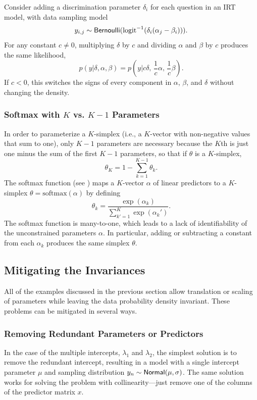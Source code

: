 Consider adding a discrimination parameter $\delta_i$ for each
question in an IRT model, with data sampling model
\[
y_{i, j} \sim \distro{Bernoulli}(\mbox{logit}^{-1}(\delta_i(\alpha_j - \beta_i))).
\]
For any constant $c \neq 0$, multiplying $\delta$ by $c$ and dividing
$\alpha$ and $\beta$ by $c$ produces the same likelihood,
\[
p(y|\delta,\alpha,\beta)
= p(y|c \delta, \, \frac{1}{c}\alpha, \, \frac{1}{c}\beta).
\]
If $c < 0$, this switches the signs of every component in $\alpha$,
$\beta$, and $\delta$ without changing the density.


\subsubsection{Softmax with $K$ vs. $K-1$ Parameters}

In order to parameterize a $K$-simplex (i.e., a $K$-vector with
non-negative values that sum to one), only $K - 1$ parameters are
necessary because the $K$th is just one minus the sum of the first $K
- 1$ parameters, so that if $\theta$ is a $K$-simplex,
%
\[
\theta_K = 1 - \sum_{k=1}^{K-1} \theta_k.
\]
%
The softmax function (see ) maps a $K$-vector
$\alpha$ of linear predictors to a $K$-simplex $\theta =
\mbox{softmax}(\alpha)$ by defining
%
\[
\theta_k = \frac{\exp(\alpha_k)}{\sum_{k'=1}^K \exp(\alpha_k')}.
\]
%
The softmax function is many-to-one, which leads to a lack of
identifiability of the unconstrained parameters $\alpha$.  In
particular, adding or subtracting a constant from each $\alpha_k$
produces the same simplex $\theta$. 



\subsection{Mitigating the Invariances}

All of the examples discussed in the previous section allow
translation or scaling of parameters while leaving the data
probability density invariant.  These problems can be mitigated in
several ways.

\subsubsection{Removing Redundant Parameters or Predictors}

In the case of the multiple intercepts, $\lambda_1$ and $\lambda_2$,
the simplest solution is to remove the redundant intercept, resulting
in a model with a single intercept parameter $\mu$ and sampling
distribution $y_n \sim \distro{Normal}(\mu, \sigma)$.  The same
solution works for solving the problem with collinearity---just remove
one of the columns of the predictor matrix $x$.

